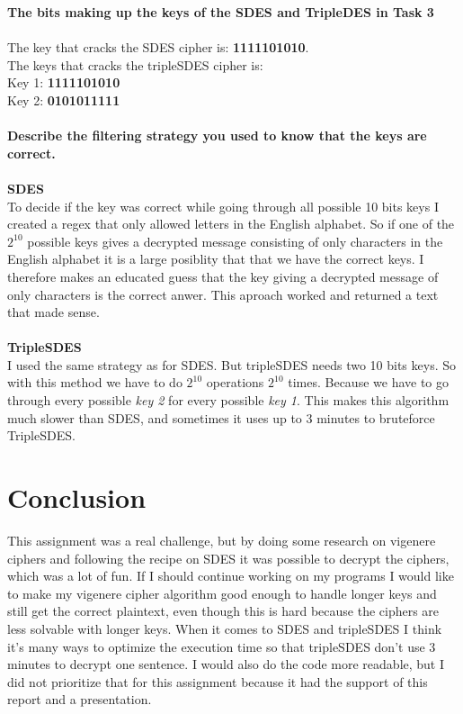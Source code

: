 \documentclass[12pt, letterpaper]{article}
\begin{document}
\textbf{The bits making up the keys of the SDES and TripleDES in Task 3}
\\ \\
The key that cracks the SDES cipher is: \textbf{1111101010}. \\
The keys that cracks the tripleSDES cipher is: \\ Key 1: \textbf{1111101010} \\ Key 2: \textbf{0101011111}
\\ \\
\textbf{Describe the filtering strategy you used to know that the keys are correct.}
\\ \\
\textbf{SDES} \\ 
To decide if the key was correct while going through all possible 10 bits keys I created a regex that only allowed letters in the English alphabet. So if one of the $2^{10}$ possible keys gives a decrypted message consisting of only characters in the English alphabet it is a large posiblity that that we have the correct keys. I therefore makes an educated guess that the key giving a decrypted message of only characters is the correct anwer. This aproach worked and returned a text that made sense.
\\ \\
\textbf{TripleSDES} \\
I used the same strategy as for SDES. But tripleSDES needs two 10 bits keys. So with this method we have to do $2^{10}$ operations $2^{10}$ times. Because we have to go through every possible \textit{key 2} for every possible \textit{key 1}. This makes this algorithm much slower than SDES, and sometimes it uses up to 3 minutes to bruteforce TripleSDES.


\section*{Conclusion}
This assignment was a real challenge, but by doing some research on vigenere ciphers and following the recipe on SDES it was possible to decrypt the ciphers, which was a lot of fun. If I should continue working on my programs I would like to make my vigenere cipher algorithm good enough to handle longer keys and still get the correct plaintext, even though this is hard because the ciphers are less solvable with longer keys. When it comes to SDES and tripleSDES I think it's many ways to optimize the execution time so that tripleSDES don't use 3 minutes to decrypt one sentence. I would also do the code more readable, but I did not prioritize that for this assignment because it had the support of this report and a presentation.
\end{document}
